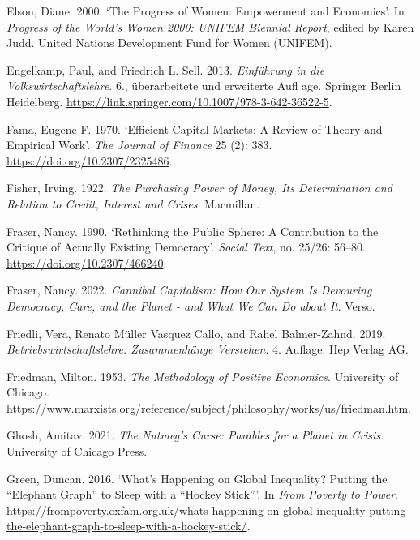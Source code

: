 \documentclass[
  british,
  a4paper,
  DIV=11,
  numbers=noendperiod,
  oneside,
  openany]{scrreprt}
\newlength{\cslhangindent}
\newenvironment{CSLReferences}[2] %
 {\begin{list}{}{%
  \setlength{\itemindent}{0pt}
  \setlength{\leftmargin}{0pt}
  \setlength{\parsep}{0pt}
  \ifodd #1
   \setlength{\leftmargin}{\cslhangindent}
   \setlength{\itemindent}{-1\cslhangindent}
  \fi
  \setlength{\itemsep}{#2\baselineskip}}}
 {\end{list}}
\begin{document}
\begin{CSLReferences}{1}{1}
Elson, Diane. 2000. {`The {Progress} of {Women}: {Empowerment} and
{Economics}'}. In \emph{Progress of the {World}'s {Women} 2000: {UNIFEM}
{Biennial} {Report}}, edited by Karen Judd. United Nations Development
Fund for Women (UNIFEM).

Engelkamp, Paul, and Friedrich L. Sell. 2013. \emph{Einführung in die
Volkswirtschaftslehre}. 6., überarbeitete und erweiterte Aufl age.
Springer Berlin Heidelberg.
\url{https://link.springer.com/10.1007/978-3-642-36522-5}.

Fama, Eugene F. 1970. {`Efficient {Capital} {Markets}: {A} {Review} of
{Theory} and {Empirical} {Work}'}. \emph{The Journal of Finance} 25 (2):
383. \url{https://doi.org/10.2307/2325486}.

Fisher, Irving. 1922. \emph{The Purchasing Power of Money, Its
Determination and Relation to Credit, Interest and Crises}. Macmillan.

Fraser, Nancy. 1990. {`Rethinking the {Public} {Sphere}: {A}
{Contribution} to the {Critique} of {Actually} {Existing} {Democracy}'}.
\emph{Social Text}, no. 25/26: 56--80.
\url{https://doi.org/10.2307/466240}.

Fraser, Nancy. 2022. \emph{Cannibal {Capitalism}: {How} {Our} {System}
{Is} {Devouring} {Democracy}, {Care}, and the {Planet} - and {What} {We}
{Can} {Do} about {It}}. Verso.

Friedli, Vera, Renato Müller Vasquez Callo, and Rahel Balmer-Zahnd.
2019. \emph{Betriebswirtschaftslehre: Zusammenhänge Verstehen}. 4.
Auflage. Hep Verlag AG.

Friedman, Milton. 1953. \emph{The Methodology of Positive Economics}.
University of Chicago.
\url{https://www.marxists.org/reference/subject/philosophy/works/us/friedman.htm}.

Ghosh, Amitav. 2021. \emph{The Nutmeg's Curse: Parables for a Planet in
Crisis}. University of Chicago Press.

Green, Duncan. 2016. {`What's Happening on {Global} {Inequality}?
{Putting} the {``Elephant Graph''} to Sleep with a {``Hockey Stick''}'}.
In \emph{From Poverty to Power}.
\url{https://frompoverty.oxfam.org.uk/whats-happening-on-global-inequality-putting-the-elephant-graph-to-sleep-with-a-hockey-stick/}.


\end{CSLReferences}
\end{document}
